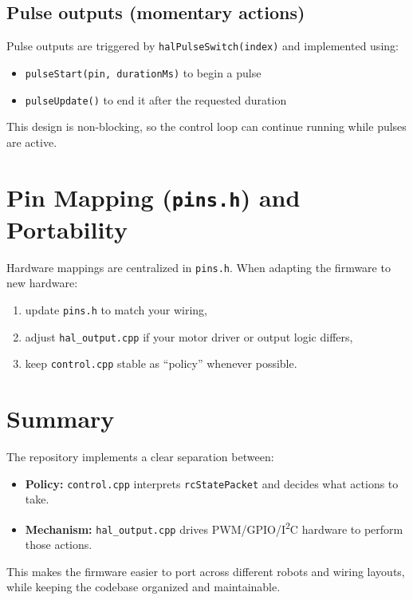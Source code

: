 \subsection{Pulse outputs (momentary actions)}
\label{subsec:control-hal-hal-pulses}

Pulse outputs are triggered by \texttt{halPulseSwitch(index)} and implemented using:

\begin{itemize}
    \item \texttt{pulseStart(pin, durationMs)} to begin a pulse
    \item \texttt{pulseUpdate()} to end it after the requested duration
\end{itemize}

This design is non-blocking, so the control loop can continue running while pulses are active.

\section{Pin Mapping (\texttt{pins.h}) and Portability}
\label{sec:control-hal-pins}

Hardware mappings are centralized in \texttt{pins.h}. When adapting the firmware to new hardware:

\begin{enumerate}
    \item update \texttt{pins.h} to match your wiring,
    \item adjust \texttt{hal\_output.cpp} if your motor driver or output logic differs,
    \item keep \texttt{control.cpp} stable as ``policy'' whenever possible.
\end{enumerate}

\section{Summary}
\label{sec:control-hal-summary}

The repository implements a clear separation between:

\begin{itemize}
    \item \textbf{Policy:} \texttt{control.cpp} interprets \texttt{rcStatePacket} and decides what actions to take.
    \item \textbf{Mechanism:} \texttt{hal\_output.cpp} drives PWM/GPIO/I\textsuperscript{2}C hardware to perform those actions.
\end{itemize}

This makes the firmware easier to port across different robots and wiring layouts, while keeping the codebase
organized and maintainable.
